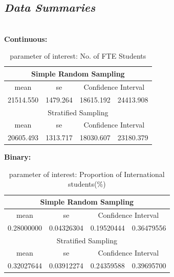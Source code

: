 \documentclass{article}
\begin{document}
\subsection{{\textbf{\textit{Data Summaries}}}}\\

\textbf{Continuous:}\\

 \begin{table}[h]
    \begin{center}
    \caption{parameter of interest: No. of FTE Students}
    \begin{tabular}{ | c| c | c | c |}
    \hline
    \multicolumn{4}{|c|}{Simple Random Sampling} \\
    \hline
    mean & se & \multicolumn{2}{|c|}{Confidence Interval} \\ 
    \hline
    21514.550 & 1479.264 & 18615.192 & 24413.908\\ 
    \hline
    \multicolumn{4}{|c|}{Stratified Sampling} \\
    \hline
    mean & se & \multicolumn{2}{|c|}{Confidence Interval} \\ 
    \hline
    20605.493 & 1313.717 & 18030.607 & 23180.379\\ 
    \hline
    \end{tabular}
    \label{tab:(a)}
    \end{center}
    \end{table}

\textbf{Binary:}

\begin{table}[h]
    \begin{center}
    \caption{parameter of interest: Proportion of International students(\%)}
    \begin{tabular}{ | c| c | c | c |}
    \hline
    \multicolumn{4}{|c|}{Simple Random Sampling} \\
    \hline
    mean & se & \multicolumn{2}{|c|}{Confidence Interval} \\ 
    \hline
    0.28000000 & 0.04326304 & 0.19520444 & 0.36479556\\ 
    \hline
    \multicolumn{4}{|c|}{Stratified Sampling} \\
    \hline
    mean & se & \multicolumn{2}{|c|}{Confidence Interval} \\ 
    \hline
    0.32027644 & 0.03912274 & 0.24359588 & 0.39695700\\ 
    \hline
    \end{tabular}
    \label{tab:(b)}
    \end{center}
    \end{table}
\end{document}
